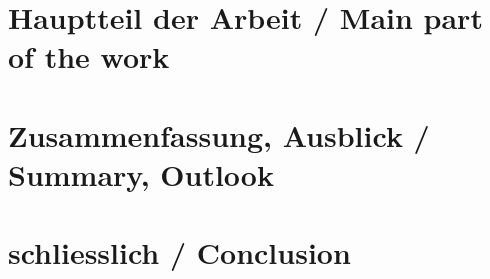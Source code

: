 \documentclass[a4paper, 10pt]{report}
\begin{document}

\chapter{Hauptteil der Arbeit / Main part of the work}


\chapter{Zusammenfassung, Ausblick / Summary, Outlook}

\chapter{schliesslich / Conclusion}

\cleardoublepage
\listoffigures 	 
{} 

\cleardoublepage


\end{document}
